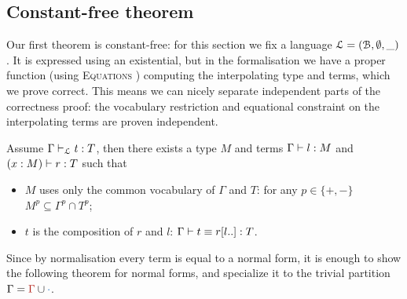 \documentclass[a4paper,UKenglish,cleveref, autoref, thm-restate]{lipics-v2021}
\begin{document}
\subsection{Constant-free theorem}

Our first theorem is constant-free: for
this section we fix a language \(\mathcal{L} = (\mathcal{B},\emptyset,\_)\).
It is expressed using an existential, but in the formalisation
we have a proper function (using \textsc{Equations} \cite{Sozeau2019})
computing the interpolating type and terms, which we prove correct.
This means we can nicely separate independent parts of the correctness
proof: the vocabulary restriction and equational constraint on the interpolating
terms are proven independent.

\begin{theorem}
  Assume \(\typing[\lang]{\Gamma}{t}[T]\), then there exists a type \(M\) and terms
  \(\typing{\Gamma}{l}[M]\) and \(\typing{(x:M)}{r}[T]\) such that
  \begin{itemize}
  \item \(M\) uses only the common vocabulary of \(\Gamma\) and \(T\):
    for any \(p \in \{+,-\}\) \(M^p \subseteq \Gamma^p \cap T^p\);
  \item \(t\) is the composition of \(r\) and \(l\): \(\conv{\Gamma}{t}{\subs{r}{l..}}[T]\).
  \end{itemize}
\end{theorem}

Since by normalisation every term is equal to a normal form, it is enough
to show the following theorem for normal forms,
and specialize it to the trivial partition \(\Gamma = \part{\Gamma}{\emp}\).
\end{document}

